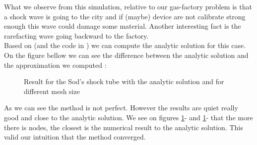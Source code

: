 \newpage 
What we observe from this simulation, relative to our gas-factory problem is that a shock wave is going to the city and if (maybe) device are not calibrate strong enough this wave could damage some material. Another interesting fact is the rarefacting wave going backward to the factory.\\
Based on \cite{sod_analytic} (and the code in \cite{sod_analytic_code}) we can compute the analytic solution for this case. On the figure bellow we can see the difference between the analytic solution and the approximation we computed : 

\begin{figure}[H]
\hspace{-1.3cm}
\begin{minipage}{.5\linewidth}
\centering
{}
\end{minipage}
\hfill
\begin{minipage}{.5\linewidth}
\centering
{}
\end{minipage}
\vspace{0.5cm}
\hspace{-1.3cm}
\begin{minipage}{.5\linewidth}
\centering
{}
\end{minipage}
\hfill
\begin{minipage}{.5\linewidth}
\centering
{} 
\end{minipage}
\caption{\label{fig:sodResult}Result for the Sod's shock tube with the analytic solution and for different mesh size}
\end{figure}

As we can see the method is not perfect. However the results are quiet really good and close to the analytic solution. We see on figures \ref{fig:sodResult}- and \ref{fig:sodResult}- that the more there is nodes, the closest is the numerical result to the analytic solution. This valid our intuition that the method converged.




\newpage


